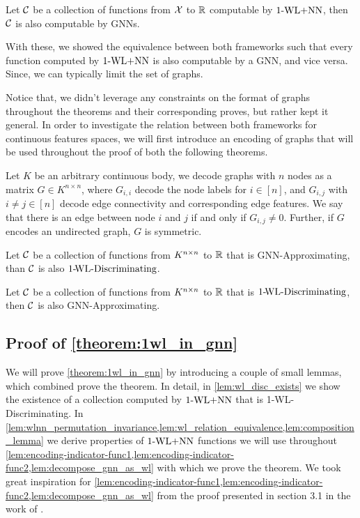 \begin{theorem}\label{theorem:gnn_in_1wl}
    Let $\mathcal{C}$ be a collection of functions from $\mathcal{X}$ to $\mathbb{R}$ computable by $\text{1-WL+NN}$, then $\mathcal{C}$ is also computable by GNNs.
\end{theorem}
With these, we showed the equivalence between both frameworks such that every function computed by $\text{1-WL+NN}$ is also computable by a GNN, and vice versa. Since, we can typically limit the set of graphs.

Notice that, we didn't leverage any constraints on the format of graphs throughout the theorems and their corresponding proves, but rather kept it general. In order to investigate the relation between both frameworks for continuous features spaces, we will first introduce an encoding of graphs that will be used throughout the proof of both the following theorems.

\begin{definition}
    Let $K$ be an arbitrary continuous body, we decode graphs with $n$ nodes as a matrix $G \in K^{n \times n}$, where $G_{i,i}$ decode the node labels for $i \in [n]$, and $G_{i,j}$ with $i \neq j \in [n]$ decode edge connectivity and corresponding edge features. We say that there is an edge between node $i$ and $j$ if and only if $G_{i,j} \neq 0$. Further, if $G$ encodes an undirected graph, $G$ is symmetric.
\end{definition}


\begin{theorem}\label{theorem:1wl_in_gnn_approximating}
    Let $\mathcal{C}$ be a collection of functions from $K^{n \times n}$ to $\mathbb{R}$ that is GNN-Approximating, than $\mathcal{C}$ is also $\text{1-\!WL-Discriminating}$.
\end{theorem}

\begin{theorem}\label{theorem:gnn_approximating_in_1wl}
    Let $\mathcal{C}$ be a collection of functions from $K^{n \times n}$ to $\mathbb{R}$ that is $\text{1-\!WL-Discriminating}$, then $\mathcal{C}$ is also GNN-Approximating.
\end{theorem}

\subsection{Proof of \cref{theorem:1wl_in_gnn}}
We will prove \cref{theorem:1wl_in_gnn} by introducing a couple of small lemmas, which combined prove the theorem. In detail, in \cref{lem:wl_disc_exists} we show the existence of a collection computed by $\text{1-WL+NN}$ that is 1-\!WL-Discriminating. In \cref{lem:wlnn_permutation_invariance,lem:wl_relation_equivalence,lem:composition_lemma} we derive properties of $\text{1-WL+NN}$ functions we will use throughout \cref{lem:encoding-indicator-func1,lem:encoding-indicator-func2,lem:decompose_gnn_as_wl} with which we prove the theorem.
We took great inspiration for \cref{lem:encoding-indicator-func1,lem:encoding-indicator-func2,lem:decompose_gnn_as_wl} from the proof presented in section 3.1 in the work of \cite{Chen2019}.

